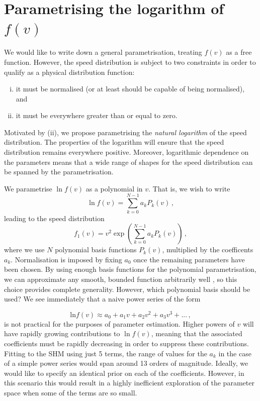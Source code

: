 \section{Parametrising the logarithm of $f(v)$}
\label{sec:Poly:parametrisation}

We would like to write down a general parametrisation, treating $f(v)$ as a free function. However, the speed distribution is subject to two constraints in order to qualify as a physical distribution function:
\begin{enumerate}[(i)]
\item it must be normalised (or at least should be capable of being normalised), and
\item it must be everywhere greater than or equal to zero.
\end{enumerate}
Motivated by (ii), we propose parametrising the \textit{natural logarithm} of the speed distribution. The properties of the logarithm will ensure that the speed distribution remains everywhere positive. Moreover, logarithmic dependence on the parameters means that a wide range of shapes for the speed distribution can be spanned by the parametrisation.

We parametrise $\ln f(v)$ as a polynomial in $v$. That is, we wish to write
\begin{equation}
\ln f(v) = \sum_{k = 0}^{N-1} a_k P_k(v)\,,
\end{equation}
leading to the speed distribution
\begin{equation}
f_1(v) = v^2 \exp\left( \sum_{k = 0}^{N-1} a_k P_k(v)\right)\,,
\end{equation}
where we use $N$ polynomial basis functions $P_k(v)$, multiplied by the coefficents $a_k$. Normalisation is imposed by fixing $a_0$ once the remaining parameters have been chosen. By using enough basis functions for the polynomial parametrisation, we can approximate any smooth, bounded function arbitrarily well \cite{Press:2007}, so this choice provides complete generality. However, which polynomial basis should be used? We see immediately that a naive power series of the form

\begin{equation}
\textrm{ln}f(v) \approx a_0 + a_1 v + a_2 v^2 + a_3 v^3 + ...\,,
\end{equation}
is not practical for the purposes of parameter estimation. Higher powers of $v$ will have rapidly growing contributions to $\ln f(v)$, meaning that the associated coefficients must be rapidly decreasing in order to suppress these contributions. Fitting to the SHM using just 5 terms, the range of values for the $a_k$ in the case of a simple power series would span around 13 orders of magnitude. Ideally, we would like to specify an identical prior on each of the coefficients. However, in this scenario this would result in a highly inefficient exploration of the parameter space when some of the terms are so small.

